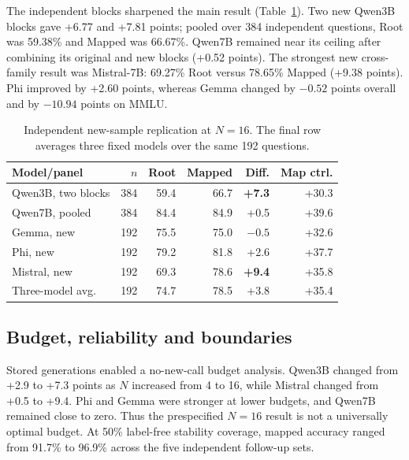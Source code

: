\documentclass{article}
\begin{document}
The independent blocks sharpened the main result (Table~\ref{tab:replication}). Two new Qwen3B blocks gave +6.77 and +7.81 points; pooled over 384 independent questions, Root was 59.38\% and Mapped was 66.67\%. Qwen7B remained near its ceiling after combining its original and new blocks (+0.52 points). The strongest new cross-family result was Mistral-7B: 69.27\% Root versus 78.65\% Mapped (+9.38 points). Phi improved by +2.60 points, whereas Gemma changed by $-0.52$ points overall and by $-10.94$ points on MMLU.

\begin{table}[t]
\centering\small
\caption{Independent new-sample replication at $N=16$. The final row averages three fixed models over the same 192 questions.}
\label{tab:replication}
\setlength{\tabcolsep}{2pt}
\begin{tabular}{@{}lrrrrr@{}}
\toprule
Model/panel & $n$ & Root & Mapped & Diff. & Map ctrl.\\
\midrule
Qwen3B, two blocks & 384 & 59.4 & 66.7 & \textbf{+7.3} & +30.3\\
Qwen7B, pooled & 384 & 84.4 & 84.9 & +0.5 & +39.6\\
Gemma, new & 192 & 75.5 & 75.0 & $-0.5$ & +32.6\\
Phi, new & 192 & 79.2 & 81.8 & +2.6 & +37.7\\
Mistral, new & 192 & 69.3 & 78.6 & \textbf{+9.4} & +35.8\\
Three-model avg. & 192 & 74.7 & 78.5 & +3.8 & +35.4\\
\bottomrule
\end{tabular}
\end{table}

\subsection{Budget, reliability and boundaries}
Stored generations enabled a no-new-call budget analysis. Qwen3B changed from +2.9 to +7.3 points as $N$ increased from 4 to 16, while Mistral changed from +0.5 to +9.4. Phi and Gemma were stronger at lower budgets, and Qwen7B remained close to zero. Thus the prespecified $N=16$ result is not a universally optimal budget. At 50\% label-free stability coverage, mapped accuracy ranged from 91.7\% to 96.9\% across the five independent follow-up sets.
\end{document}
